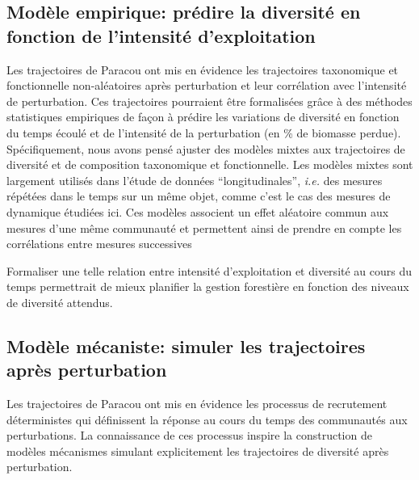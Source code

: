 \documentclass[
  11pt,
  french,
  A4paper,
  extrafontsizes,onecolumn,openright
  ]{memoir}
\begin{document}
\subsection{Modèle empirique: prédire la diversité en fonction de
l'intensité
d'exploitation}\label{modele-empirique-predire-la-diversite-en-fonction-de-lintensite-dexploitation}

Les trajectoires de Paracou ont mis en évidence les trajectoires
taxonomique et fonctionnelle non-aléatoires après perturbation et leur
corrélation avec l'intensité de perturbation. Ces trajectoires
pourraient être formalisées grâce à des méthodes statistiques empiriques
de façon à prédire les variations de diversité en fonction du temps
écoulé et de l'intensité de la perturbation (en \% de biomasse perdue).
Spécifiquement, nous avons pensé ajuster des modèles mixtes aux
trajectoires de diversité et de composition taxonomique et
fonctionnelle. Les modèles mixtes sont largement utilisés dans l'étude
de données ``longitudinales'', \emph{i.e.} des mesures répétées dans le
temps sur un même objet, comme c'est le cas des mesures de dynamique
étudiées ici. Ces modèles associent un effet aléatoire commun aux
mesures d'une même communauté et permettent ainsi de prendre en compte
les corrélations entre mesures successives

Formaliser une telle relation entre intensité d'exploitation et
diversité au cours du temps permettrait de mieux planifier la gestion
forestière en fonction des niveaux de diversité attendus.

\subsection{Modèle mécaniste: simuler les trajectoires après
perturbation}\label{modele-mecaniste-simuler-les-trajectoires-apres-perturbation}

Les trajectoires de Paracou ont mis en évidence les processus de
recrutement déterministes qui définissent la réponse au cours du temps
des communautés aux perturbations. La connaissance de ces processus
inspire la construction de modèles mécanismes simulant explicitement les
trajectoires de diversité après perturbation.
\end{document}

